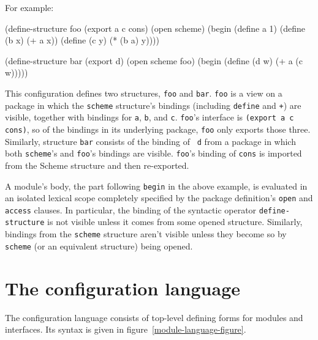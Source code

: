For example:
\begin{example}
(define-structure foo (export a c cons)
  (open scheme)
  (begin (define a 1)
         (define (b x) (+ a x))
         (define (c y) (* (b a) y))))

(define-structure bar (export d)
  (open scheme foo)
  (begin (define (d w) (+ a (c w)))))
\end{example}
This configuration defines two structures, {\tt foo} and {\tt bar}.
{\tt foo} is a view on a package in which the {\tt scheme} structure's
bindings (including {\tt define} and {\tt +}) are visible, together
with bindings for {\tt a}, {\tt b},
and {\tt c}.  {\tt foo}'s interface is {\tt (export a c cons)}, so of
the bindings in its underlying package, {\tt foo} only exports those
three.  Similarly, structure {\tt bar} consists of the binding of {\tt
d} from a package in which both {\tt scheme}'s and {\tt foo}'s
bindings are visible.  {\tt foo}'s binding of {\tt cons} is imported
from the Scheme structure and then re-exported.

A module's body, the part following {\tt begin} in the above example,
is evaluated in an isolated lexical scope completely specified by the
package definition's {\tt open} and {\tt access} clauses.  In
particular, the binding of the syntactic operator {\tt define-structure}
is not visible unless it comes from some opened structure.  Similarly,
bindings from the {\tt scheme} structure aren't visible unless they
become so by {\tt scheme} (or an equivalent structure) being opened.


\section{The configuration language}

The configuration language consists of top-level defining forms for
 modules and interfaces.
Its syntax is given in figure~\ref{module-language-figure}.

\texonly{}\hbox{\goesto}\endtexonly
\texonly\newcommand{\altz}{\hbox to 1\wd0{\hfil\alt}}\endtexonly
\htmlonly\newcommand{\altz}{\goesto}\endhtmlonly

